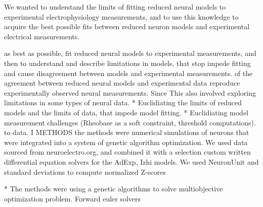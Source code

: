 We wanted to understand the limits of fitting reduced neural models to experimental electrophysiology measurements, and to use this knowledge to acquire the best possible fits between reduced neuron models and experimental electrical measurements.

as best as possible, fit reduced neural models to experimental measurements, and then to understand and describe limitations in models, that stop impede fitting and cause disagreement between models and experimental measurements.
of the agreement between reduced neural models and experimental data reproduce experimentally observed neural measurements.
Since This also involved exploring limitations in some types of neural data.
* Euclidiating the limits of reduced models and the limits of data, that impede model fitting.
* Euclidiating model measurement challenges (Rheobase as a soft constraint, threshold computations).
to data. I
METHODS the methods were numerical simulations of neurons that were integrated into a system of genetic algorithm optimization. We used data sourced from neuroelectro.org, and combined it with a selection custom written differential equation solvers for the AdExp, Izhi models. We used NeuronUnit and standard deviations to compute normalized Z-scores 


* The methods were using a genetic algorithms to solve multiobjective optimization problem. Forward euler solvers

